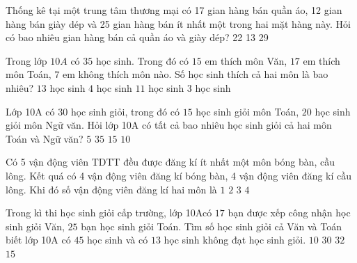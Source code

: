 \begin{ex}
Thống kê tại một trung tâm thương mại có 17 gian hàng bán quần áo, 12 gian hàng bán giày dép và 25 gian hàng bán ít nhất một trong hai mặt hàng này. Hỏi có bao nhiêu gian hàng bán cả quần áo và giày dép?
\choice
{22}
{13}
{29}
{}
\end{ex}

\begin{ex}
Trong lớp $10A$ có $35$ học sinh. Trong đó có $15$ em thích môn Văn, $17$ em thích môn Toán, $7$ em không thích môn nào. Số học sinh thích cả hai môn là bao nhiêu?
\choice
{$13$ học sinh}
{\True $4$ học sinh}
{$11$ học sinh}
{$3$ học sinh}
\end{ex}

\begin{ex}
Lớp 10A có $30$ học sinh giỏi, trong đó có $15$ học sinh giỏi môn Toán, $20$ học sinh giỏi môn Ngữ văn. Hỏi lớp 10A có tất cả bao nhiêu học sinh giỏi cả hai môn Toán và Ngữ văn?
\choice
{\True $5$}
{$35$}
{$15$}
{$10$}
\end{ex}

\begin{ex}
Có 5 vận động viên TDTT đều được đăng kí ít nhất một môn bóng bàn, cầu lông. Kết quá có 4 vận động viên đăng kí bóng bàn, 4 vận động viên đăng kí cầu lông. Khi đó số vận động viên đăng kí hai môn là
\choice
{$1$}
{$2$}
{\True $3$}
{$4$}
\end{ex}

\begin{ex}
Trong kì thi học sinh giỏi cấp trường, lớp 10Acó $17$ bạn được xếp công nhận học sinh giỏi Văn, $25$ bạn học sinh giỏi Toán. Tìm số học sinh giỏi cả Văn và Toán biết lớp 10A có $45$ học sinh và có $13$ học sinh không đạt học sinh giỏi.
\choice
{\True $10$}
{$30$}
{$32$}
{$15$}
\end{ex}

